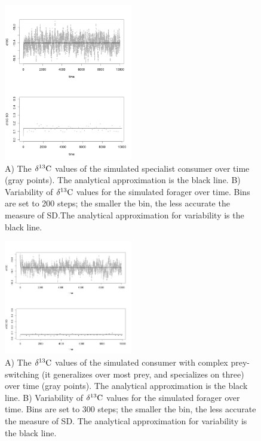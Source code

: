\documentclass[11pt]{article}
\begin{document}
\begin{figure}[h!]
   \centering
   \includegraphics[width=0.5\textwidth]{fig_d13CvsTime.png}
      \caption{
      A) The $\delta^{13}{\rm C}$ values of the simulated specialist consumer over time (gray points). The analytical approximation is the black line.
      B) Variability of $\delta^{13}{\rm C}$ values for the simulated forager over time. Bins are set to 200 steps; the smaller the bin, the less accurate the measure of SD.The analytical approximation for variability is the black line.
      }
      \label{fig_time}
\end{figure}

\begin{figure}[h!]
   \centering
   \includegraphics[width=0.5\textwidth]{fig_d13CvsTime_gen.png}
      \caption{
      A) The $\delta^{13}{\rm C}$ values of the simulated consumer with complex prey-switching (it generalizes over most prey, and specializes on three) over time (gray points). The analytical approximation is the black line.
      B) Variability of $\delta^{13}{\rm C}$ values for the simulated forager over time. Bins are set to 300 steps; the smaller the bin, the less accurate the measure of SD. The analytical approximation for variability is the black line.
      }
      \label{fig_time}
\end{figure}
\end{document}
